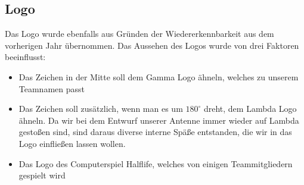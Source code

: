 \subsection{Logo}
Das Logo wurde ebenfalls aus Gründen der Wiedererkennbarkeit aus dem vorherigen Jahr übernommen. Das Aussehen des Logos wurde von drei Faktoren beeinflusst:
\begin{itemize}
	\item Das Zeichen in der Mitte soll dem Gamma Logo ähneln, welches zu unserem Teamnamen passt
	\item Das Zeichen soll zusätzlich, wenn man es um $180^\circ$ dreht, dem Lambda Logo ähneln. Da wir bei dem Entwurf unserer Antenne immer wieder auf Lambda gestoßen sind, sind daraus diverse interne Späße entstanden, die wir in das Logo einfließen lassen wollen.
	\item Das Logo des Computerspiel Halflife, welches von einigen Teammitgliedern gespielt wird
\end{itemize}